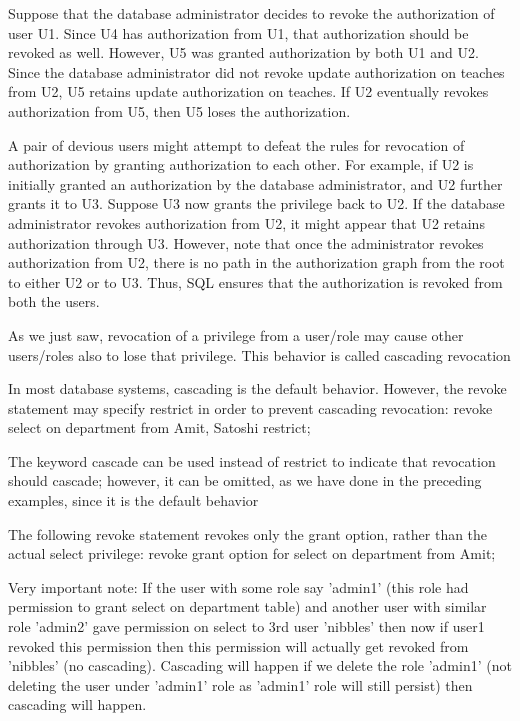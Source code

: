 \documentclass[8pt, a4paper, oneside, twocolumn]{extarticle}
\begin{document}
Suppose that the database administrator decides to revoke the authorization of
user U1. Since U4 has authorization from U1, that authorization should be revoked
as well. However, U5 was granted authorization by both U1 and U2. Since the
database administrator did not revoke update authorization on teaches from U2,
U5 retains update authorization on teaches. If U2 eventually revokes authorization
from U5, then U5 loses the authorization.

A pair of devious users might attempt to defeat the rules for revocation
of authorization by granting authorization to each other. For example, if U2 is
initially granted an authorization by the database administrator, and U2 further
grants it to U3. Suppose U3 now grants the privilege back to U2. If the database
administrator revokes authorization from U2, it might appear that U2 retains
authorization through U3. However, note that once the administrator revokes
authorization from U2, there is no path in the authorization graph from the root
to either U2 or to U3. Thus, SQL ensures that the authorization is revoked from
both the users.

As we just saw, revocation of a privilege from a user/role may cause other
users/roles also to lose that privilege. This behavior is called cascading revocation

In most database systems, cascading is the default behavior. However, the revoke
statement may specify restrict in order to prevent cascading revocation:
revoke select on department from Amit, Satoshi restrict;

The keyword cascade can be used instead of restrict to indicate that revocation
should cascade; however, it can be omitted, as we have done in the preceding
examples, since it is the default behavior

The following revoke statement revokes only the grant option, rather than
the actual select privilege:
revoke grant option for select on department from Amit;


Very important note: If the user with some role say 'admin1' (this role had permission to grant select on department table) and another user with similar role 'admin2' gave permission on select to 3rd user 'nibbles' then now if user1 revoked this permission then this permission will actually get revoked from 'nibbles' (no cascading). Cascading will happen if we delete the role 'admin1' (not deleting the user under 'admin1' role as 'admin1' role will still persist) then cascading will happen.
\end{document}
